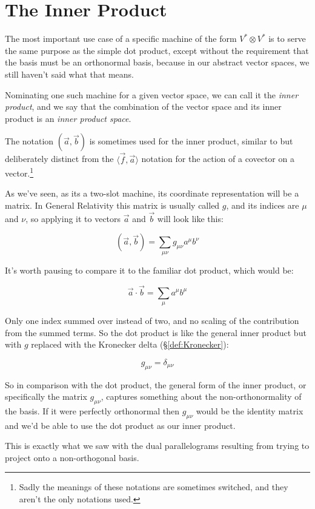 \section{The Inner Product}

The most important use case of a specific machine of the form $V^* \otimes V^*$ is to serve the same purpose as the simple dot product, except without the requirement that the basis must be an orthonormal basis, because in our abstract vector spaces, we still haven't said what that means.

Nominating one such machine for a given vector space, we can call it the \textit{inner product}, and we say that the combination of the vector space and its inner product is an \textit{inner product space}.

The notation $(\vec{a},\vec{b})$ is sometimes used for the inner product, similar to but deliberately distinct from the $\langle \vec{f},\vec{a}\rangle$ notation for the action of a covector on a vector.\footnote{Sadly the meanings of these notations are sometimes switched, and they aren't the only notations used.}

As we've seen, as its a two-slot machine, its coordinate representation will be a matrix. In General Relativity this matrix is usually called $g$, and its indices are $\mu$ and $\nu$, so applying it to vectors $\vec{a}$ and $\vec{b}$ will look like this:

$$
(\vec{a},\vec{b}) = \sum_{\mu\nu} g_{\mu\nu} a^\mu b^\nu
$$

It's worth pausing to compare it to the familiar dot product, which would be:

$$
\vec{a} \cdot \vec{b} = \sum_{\mu} a^\mu b^\mu
$$

Only one index summed over instead of two, and no scaling of the contribution from the summed terms. So the dot product is like the general inner product but with $g$ replaced with the Kronecker delta (§\ref{def:Kronecker}):

$$
g_{\mu\nu} = \delta_{\mu\nu}
$$

So in comparison with the dot product, the general form of the inner product, or specifically the matrix $g_{\mu\nu}$, captures something about the non-orthonormality of the basis. If it were perfectly orthonormal then $g_{\mu\nu}$ would be the identity matrix and we'd be able to use the dot product as our inner product.

This is exactly what we saw with the dual parallelograms resulting from trying to project onto a non-orthogonal basis.


